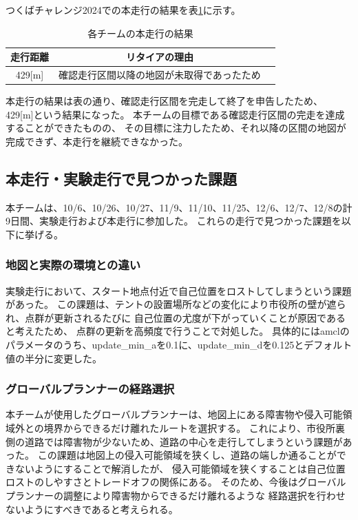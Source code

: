 \documentclass[twocolumn,9pt]{jsproceedings}
\begin{document}
つくばチャレンジ2024での本走行の結果を表\ref{MainRun}に示す。

\begin{table}[H]
  \caption{各チームの本走行の結果}
  \label{MainRun}
  \begin{tabular}{|c|c|p{4.0cm}|}
    \hline
    走行距離 & リタイアの理由                                                                                             \\
    \hline
    429[m]   & 確認走行区間以降の地図が未取得であったため                                                           \\
    \hline
  \end{tabular}
\end{table}

本走行の結果は表の通り、確認走行区間を完走して終了を申告したため、
429[m]という結果になった。
本チームの目標である確認走行区間の完走を達成することができたものの、
その目標に注力したため、それ以降の区間の地図が完成できず、本走行を継続できなかった。

\subsection{本走行・実験走行で見つかった課題}

本チームは、10/6、10/26、10/27、11/9、11/10、11/25、12/6、12/7、12/8の計9日間、実験走行および本走行に参加した。
これらの走行で見つかった課題を以下に挙げる。
\subsubsection{地図と実際の環境との違い}
実験走行において、スタート地点付近で自己位置をロストしてしまうという課題があった。
この課題は、テントの設置場所などの変化により市役所の壁が遮られ、点群が更新されるたびに
自己位置の尤度が下がっていくことが原因であると考えたため、
点群の更新を高頻度で行うことで対処した。
具体的にはamclのパラメータのうち、update\_min\_aを0.1に、update\_min\_dを0.125とデフォルト値の半分に変更した。

\subsubsection{グローバルプランナーの経路選択}
本チームが使用したグローバルプランナーは、地図上にある障害物や侵入可能領域外との境界からできるだけ離れたルートを選択する。
これにより、市役所裏側の道路では障害物が少ないため、道路の中心を走行してしまうという課題があった。
この課題は地図上の侵入可能領域を狭くし、道路の端しか通ることができないようにすることで解消したが、
侵入可能領域を狭くすることは自己位置ロストのしやすさとトレードオフの関係にある。
そのため、今後はグローバルプランナーの調整により障害物からできるだけ離れるような
経路選択を行わせないようにすべきであると考えられる。
\end{document}

